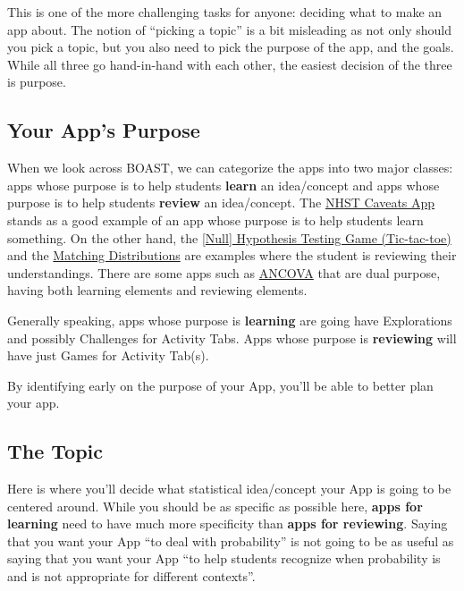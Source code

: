 \documentclass[
]{book}
\begin{document}
This is one of the more challenging tasks for anyone: deciding what to make an app about. The notion of ``picking a topic'' is a bit misleading as not only should you pick a topic, but you also need to pick the purpose of the app, and the goals. While all three go hand-in-hand with each other, the easiest decision of the three is purpose.

\hypertarget{step2a}{%
\subsection{Your App's Purpose}\label{step2a}}

When we look across BOAST, we can categorize the apps into two major classes: apps whose purpose is to help students \textbf{learn} an idea/concept and apps whose purpose is to help students \textbf{review} an idea/concept. The \href{https://psu-eberly.shinyapps.io/Significance_Testing_Caveats/}{NHST Caveats App} stands as a good example of an app whose purpose is to help students learn something. On the other hand, the \href{https://psu-eberly.shinyapps.io/Hypothesis_Testing_Game/}{{[}Null{]} Hypothesis Testing Game (Tic-tac-toe)} and the \href{https://psu-eberly.shinyapps.io/Matching_Distributions/}{Matching Distributions} are examples where the student is reviewing their understandings. There are some apps such as \href{https://psu-eberly.shinyapps.io/ANCOVA/}{ANCOVA} that are dual purpose, having both learning elements and reviewing elements.

Generally speaking, apps whose purpose is \textbf{learning} are going have Explorations and possibly Challenges for Activity Tabs. Apps whose purpose is \textbf{reviewing} will have just Games for Activity Tab(s).

By identifying early on the purpose of your App, you'll be able to better plan your app.

\hypertarget{step2b}{%
\subsection{The Topic}\label{step2b}}

Here is where you'll decide what statistical idea/concept your App is going to be centered around. While you should be as specific as possible here, \textbf{apps for learning} need to have much more specificity than \textbf{apps for reviewing}. Saying that you want your App ``to deal with probability'' is not going to be as useful as saying that you want your App ``to help students recognize when probability is and is not appropriate for different contexts''.
\end{document}
